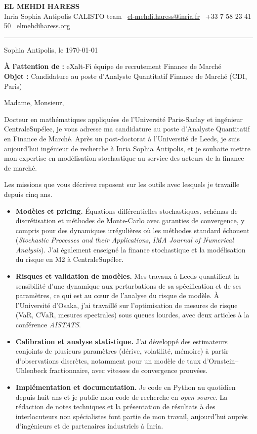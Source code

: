 \documentclass[11pt,a4paper]{article}
\makeatletter
\newcommand{\letterhead}{%
{\headingfont\bfseries\fontsize{16}{19}\selectfont EL MEHDI HARESS}\\[0.4ex]
{\footnotesize\color{muted}Inria Sophia Antipolis \textemdash{} CALISTO team\quad
\faEnvelope[regular]~\href{mailto:el-mehdi.haress@inria.fr}{el-mehdi.haress@inria.fr}\quad
\faPhone*~+33 7 58 23 41 50\quad
\faGlobe~\href{https://elmehdiharess.org}{elmehdiharess.org}}\\[-0.6ex]
{\color{rulegray}\rule{\linewidth}{0.7pt}}\par\vspace{1.2ex}}
\makeatother
\begin{document}
\letterhead

\begin{flushright}\small Sophia Antipolis, le \today\end{flushright}

\textbf{À l'attention de :} eXalt-Fi \textemdash{} équipe de recrutement Finance de Marché\\
\textbf{Objet :} Candidature au poste d'Analyste Quantitatif \textemdash{} Finance de Marché (CDI, Paris)

Madame, Monsieur,

Docteur en mathématiques appliquées de l'Université Paris-Saclay et ingénieur CentraleSupélec, je vous
adresse ma candidature au poste d'Analyste Quantitatif en Finance de Marché. Après un post-doctorat à
l'Université de Leeds, je suis aujourd'hui ingénieur de recherche à Inria Sophia Antipolis, et je souhaite
mettre mon expertise en modélisation stochastique au service des acteurs de la finance de marché.

Les missions que vous décrivez reposent sur les outils avec lesquels je travaille depuis cinq ans.
\begin{itemize}
\item \textbf{Modèles et pricing.} Équations différentielles stochastiques, schémas de discrétisation et
méthodes de Monte-Carlo avec garanties de convergence, y compris pour des dynamiques irrégulières où les
méthodes standard échouent (\emph{Stochastic Processes and their Applications}, \emph{IMA Journal of
Numerical Analysis}). J'ai également enseigné la finance stochastique et la modélisation du risque en M2
à CentraleSupélec.
\item \textbf{Risques et validation de modèles.} Mes travaux à Leeds quantifient la sensibilité d'une
dynamique aux perturbations de sa spécification et de ses paramètres, ce qui est au cœur de l'analyse du
risque de modèle. À l'Université d'Osaka, j'ai travaillé sur l'optimisation de mesures de risque
(VaR, CVaR, mesures spectrales) sous queues lourdes, avec deux articles à la conférence \emph{AISTATS}.
\item \textbf{Calibration et analyse statistique.} J'ai développé des estimateurs conjoints de plusieurs
paramètres (dérive, volatilité, mémoire) à partir d'observations discrètes, notamment pour un modèle de
taux d'Ornstein--Uhlenbeck fractionnaire, avec vitesses de convergence prouvées.
\item \textbf{Implémentation et documentation.} Je code en Python au quotidien depuis huit ans et je publie
mon code de recherche en \emph{open source}. La rédaction de notes techniques et la présentation de résultats
à des interlocuteurs non spécialistes font partie de mon travail, aujourd'hui auprès d'ingénieurs et de
partenaires industriels à Inria.
\end{itemize}
\end{document}
